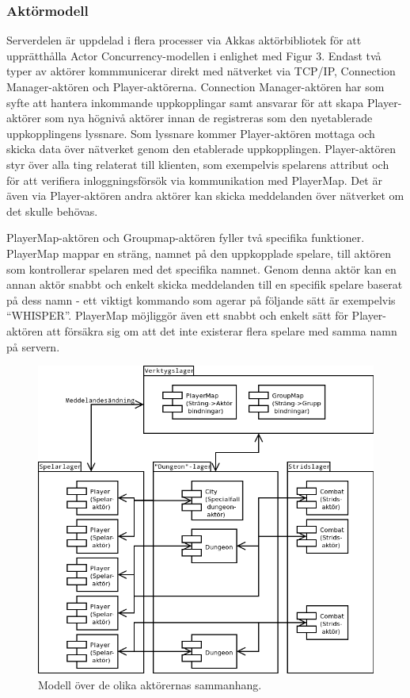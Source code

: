 \documentclass[a4paper]{article}
\begin{document}
\subsubsection{Aktörmodell}
Serverdelen är uppdelad i flera processer via Akkas aktörbibliotek för att upprätthålla Actor Concurrency-modellen i enlighet med Figur 3. Endast två typer av aktörer kommmunicerar 
direkt med nätverket via TCP/IP, Connection Manager-aktören och Player-aktörerna. Connection Manager-aktören har som syfte att hantera inkommande uppkopplingar samt ansvarar 
för att skapa Player-aktörer som nya högnivå aktörer innan de registreras som den nyetablerade uppkopplingens lyssnare. Som lyssnare kommer Player-aktören mottaga och skicka data 
över nätverket genom den etablerade uppkopplingen. Player-aktören styr över alla ting relaterat till klienten, som exempelvis spelarens attribut och för att verifiera 
inloggningsförsök via kommunikation med PlayerMap. Det är även via Player-aktören andra aktörer kan skicka meddelanden över nätverket om det skulle behövas. 

PlayerMap-aktören och Groupmap-aktören fyller två specifika funktioner. PlayerMap mappar en sträng, namnet på den uppkopplade spelare, till aktören som kontrollerar 
spelaren med det specifika namnet. Genom denna aktör kan en annan aktör snabbt och enkelt skicka meddelanden till en specifik spelare baserat på dess namn - 
ett viktigt kommando som agerar på följande sätt är exempelvis “WHISPER”. PlayerMap möjliggör även ett snabbt och enkelt sätt för Player-aktören att försäkra 
sig om att det inte existerar flera spelare med samma namn på servern.

\begin{figure}[hbt]
\centering
\includegraphics[width=1.0\textwidth]{serverActorModel2-2}
\caption{\label{fig:ServerActorModel}Modell över de olika aktörernas sammanhang.}
\end{figure}
\end{document}
